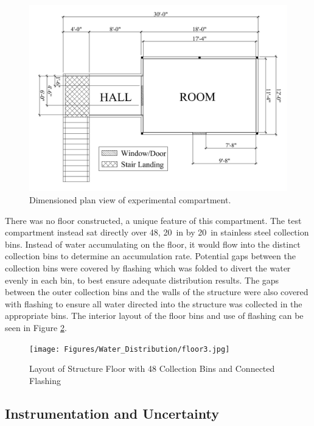 \documentclass[12pt,oneside]{book}
\begin{document}
\begin{figure}[!ht]
	\centering
	\includegraphics[width=\columnwidth]{Figures/Water_Distribution/ADDtopdownviewtext}
	\caption[Dimensioned Plan View of Experimental Compartment]{Dimensioned plan view of experimental compartment.}
	\label{fig:ADD_Top_View}
\end{figure}

\clearpage

There was no floor constructed, a unique feature of this compartment. The test compartment instead sat directly over 48, 20~in by 20~in stainless steel collection bins. Instead of water accumulating on the floor, it would flow into the distinct collection bins to determine an accumulation rate. Potential gaps between the collection bins were covered by flashing which was folded to divert the water evenly in each bin, to best ensure adequate distribution results. The gaps between the outer collection bins and the walls of the structure were also covered with flashing to ensure all water directed into the structure was collected in the appropriate bins. The interior layout of the floor bins and use of flashing can be seen in Figure \ref{fig:ADD_Flashing}. 

\begin{figure}[!ht]
	\centering
	\texttt{[image: Figures/Water\_Distribution/floor3.jpg]}
	\caption{Layout of Structure Floor with 48 Collection Bins and Connected Flashing}
	\label{fig:ADD_Flashing}
\end{figure}

\subsection{Instrumentation and Uncertainty}
\label{sec:add_instrumentation}
\end{document}
